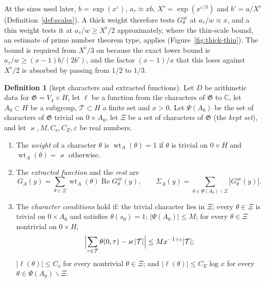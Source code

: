\documentclass[11pt]{amsbook}
\theoremstyle{plain}
\theoremstyle{definition}
\newtheorem{definition}[theorem]{Definition}
\theoremstyle{remark}
\numberwithin{equation}{section}
\numberwithin{figure}{chapter}
\numberwithin{table}{chapter}
\renewcommand{\C}{\mathbb{C}}
\newcommand{\eps}{\varepsilon}
\newcommand{\wt}{\operatorname{wt}}
\newcommand{\GG}{\mathfrak{G}}
\newcommand{\GPsi}{G^{\mathrm{ar}}}
\newcommand{\Top}{\mathcal{T}}
\begin{document}
\noindent At the sizes used later, $b=\exp(x^\eps)$, $a_\tau\approx
xb$, $X^\flat=\exp(x^{\eps/3})$ and $b'=a/X^\flat$
(Definition~\ref{def:scales}). A thick weight therefore tests
$\GPsi_\theta$ at $a_\tau/w\approx x$, and a thin weight tests it at
$a_\tau/w\ge X^\flat/2$ approximately, where the thin-scale bound, an
estimate of prime number theorem type, applies (Figure~\ref{fig:thick-thin}). The bound is required
from $X^\flat/3$ on because the exact lower bound is
$a_\tau/w\ge(x-1)b/(2b')$, and the factor $(x-1)/x$ that this loses
against $X^\flat/2$ is absorbed by passing from $1/2$ to $1/3$.
\begin{figure}[tbp]
\centering

\end{figure}

\begin{definition}[kept characters and extracted functions]
\label{def:kept-chars}
Let $D$ be arithmetic data for $\GG=V_4\times H$, let $\ell$ be a
function from the characters of $\GG$ to $\C$, let $A_0\subset H$ be a
subgroup, $\Top\subset H$ a finite set and $x>0$. Let $\Psi(A_0)$ be
the set of characters of $\GG$ trivial on $0\times A_0$, let $\Xi$ be
a set of characters of $\GG$ (the \emph{kept set}), and let
$\varkappa,M,C_o,C_E,\eps$ be real numbers.
\begin{enumerate}[label=(\arabic*)]
\item The \emph{weight} of a character $\theta$ is $\wt_A(\theta)=1$ if
$\theta$ is trivial on $0\times H$ and $\wt_A(\theta)=\varkappa$ otherwise.
\item The \emph{extracted function} and the \emph{rest} are
\[
G_A(y)=\sum_{\theta\in\Xi}\wt_A(\theta)\operatorname{Re}
\GPsi_\theta(y),\qquad
\Sigma_A(y)=\sum_{\theta\in\Psi(A_0)\smallsetminus\Xi}
|\GPsi_\theta(y)|.
\]
\item The \emph{character conditions} hold if: the trivial character
lies in $\Xi$; every $\theta\in\Xi$ is trivial on $0\times A_0$ and
satisfies $\theta(s_0)=1$; $|\Psi(A_0)|\le M$; for every $\theta\in\Xi$
nontrivial on $0\times H$,
\[
\Bigl|\sum_{\tau\in\Top}\theta(0,\tau)-\varkappa\,|\Top|\Bigr|\le
Mx^{-1+\eps}|\Top|;
\]
$|\ell(\theta)|\le C_o$ for every nontrivial $\theta\in\Xi$; and
$|\ell(\theta)|\le C_E\log x$ for every
$\theta\in\Psi(A_0)\smallsetminus\Xi$.
\end{enumerate}
\end{definition}
\end{document}
